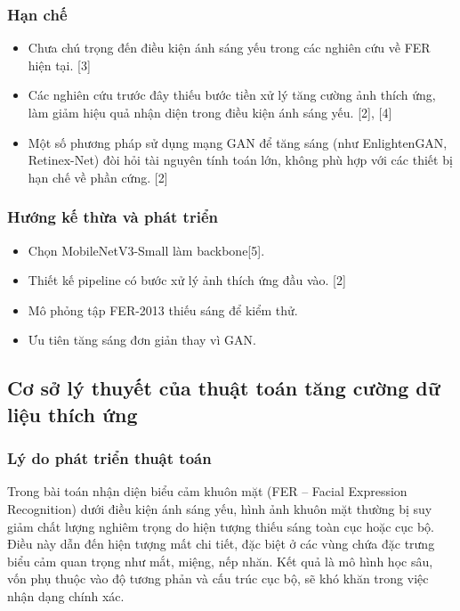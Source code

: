 \subsubsection{Hạn chế}
\begin{itemize}
    \item Chưa chú trọng đến điều kiện ánh sáng yếu trong các nghiên cứu về FER hiện tại. [3]
    \item Các nghiên cứu trước đây thiếu bước tiền xử lý tăng cường ảnh thích ứng, làm giảm hiệu quả nhận diện trong điều kiện ánh sáng yếu. [2], [4]
    \item Một số phương pháp sử dụng mạng GAN để tăng sáng (như EnlightenGAN, Retinex-Net) đòi hỏi tài nguyên tính toán lớn, không phù hợp với các thiết bị hạn chế về phần cứng. [2]
\end{itemize}

\subsubsection{Hướng kế thừa và phát triển}
\begin{itemize}
    \item Chọn MobileNetV3-Small làm backbone[5].
    \item Thiết kế pipeline có bước xử lý ảnh thích ứng đầu vào. [2]
    \item Mô phỏng tập FER-2013 thiếu sáng để kiểm thử.
    \item Ưu tiên tăng sáng đơn giản thay vì GAN.
\end{itemize}

\subsection{Cơ sở lý thuyết của thuật toán tăng cường dữ liệu thích ứng} %

\subsubsection{Lý do phát triển thuật toán} %
Trong bài toán nhận diện biểu cảm khuôn mặt (FER -- Facial Expression Recognition) dưới điều kiện ánh sáng yếu, hình ảnh khuôn mặt thường bị suy giảm chất lượng nghiêm trọng do hiện tượng thiếu sáng toàn cục hoặc cục bộ. Điều này dẫn đến hiện tượng mất chi tiết, đặc biệt ở các vùng chứa đặc trưng biểu cảm quan trọng như mắt, miệng, nếp nhăn. Kết quả là mô hình học sâu, vốn phụ thuộc vào độ tương phản và cấu trúc cục bộ, sẽ khó khăn trong việc nhận dạng chính xác. 

